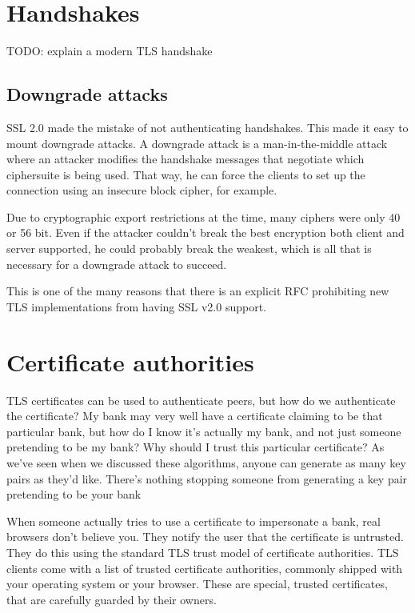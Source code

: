 \documentclass[11pt,ebook,table,dvipsnames]{memoir}
\begin{document}
\section{Handshakes}
\label{sec-3-1-2}

TODO: explain a modern TLS handshake

\subsection{Downgrade attacks}
\label{sec-3-1-2-1}

SSL 2.0 made the mistake of not authenticating handshakes. This made
it easy to mount downgrade attacks. A downgrade attack is a
man-in-the-middle attack where an attacker modifies the handshake
messages that negotiate which ciphersuite is being used. That way, he
can force the clients to set up the connection using an insecure block
cipher, for example.

Due to cryptographic export restrictions at the time, many ciphers
were only 40 or 56 bit. Even if the attacker couldn't break the best
encryption both client and server supported, he could probably break
the weakest, which is all that is necessary for a downgrade attack to
succeed.

This is one of the many reasons that there is an explicit
RFC\cite{turner:prohibitssl20} prohibiting new TLS implementations
from having SSL v2.0 support.
\section{Certificate authorities}
\label{sec-3-1-3}

TLS certificates can be used to authenticate peers, but how do we
authenticate the certificate? My bank may very well have a certificate
claiming to be that particular bank, but how do I know it's actually
my bank, and not just someone pretending to be my bank? Why should I
trust this particular certificate? As we've seen when we discussed
these algorithms, anyone can generate as many key pairs as they'd
like. There's nothing stopping someone from generating a key pair
pretending to be your bank

When someone actually tries to use a certificate to impersonate a
bank, real browsers don't believe you. They notify the user that the
certificate is untrusted. They do this using the standard TLS trust
model of certificate authorities. TLS clients come with a list of
trusted certificate authorities, commonly shipped with your operating
system or your browser. These are special, trusted certificates, that
are carefully guarded by their owners.
\end{document}

